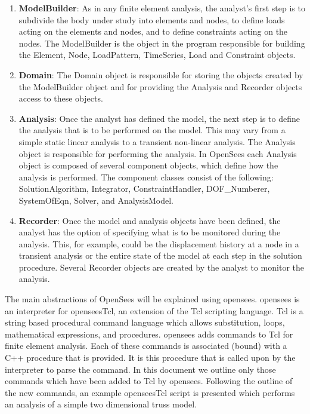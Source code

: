 \documentclass[12pt]{article}
\begin{document}
\begin{enumerate}
\item {\bf ModelBuilder}: As in any finite element analysis, the analyst's first
step is to subdivide the body under study into elements and nodes,
to define loads acting on the elements and nodes, and to define constraints
acting on the nodes. The ModelBuilder is the object in the program
responsible for building the Element, Node, LoadPattern, TimeSeries,
Load and Constraint objects.

\item {\bf Domain}: The Domain object is responsible for
storing the objects created by the ModelBuilder object and for providing the
Analysis and Recorder objects access to these objects.

\item {\bf Analysis}: Once the analyst has defined the model, the next step
is to define the analysis that is to be performed on the model. This
may vary from a simple static linear analysis to a transient
non-linear analysis. The Analysis object is responsible for performing
the analysis. In OpenSees each Analysis object is composed of several component
objects, which define how the analysis is performed. The component
classes consist of the following: { SolutionAlgorithm}, {
Integrator}, { ConstraintHandler}, { DOF\_Numberer}, {
SystemOfEqn}, { Solver}, and { AnalysisModel}. 

\item {\bf Recorder}: Once the model and analysis objects have been
defined, the analyst has the option of specifying what is to be
monitored during the analysis. This, for example, could be the
displacement history at a node in a transient analysis or the entire
state of the model at each step in the solution procedure. Several
Recorder objects are created by the analyst to monitor the analysis.
\end{enumerate}

The main abstractions of OpenSees will be explained using opensees. opensees is an
interpreter for openseesTcl, an extension of the Tcl scripting language.
Tcl is a string based procedural command language which allows
substitution, loops, mathematical expressions, and procedures. 
opensees adds commands to Tcl for finite element analysis.
Each of these commands is associated (bound) with a C++
procedure that is provided. It is this procedure that is called upon
by the interpreter to parse the command. In this document we
outline only those commands which have been added to Tcl by
opensees. Following the outline of the new commands, an example 
openseesTcl script is presented which performs an analysis of a simple two
dimensional truss model. 
\end{document}
